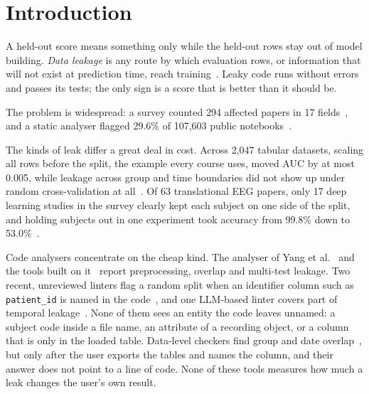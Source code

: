 \documentclass[conference]{IEEEtran}
\newcommand{\code}[1]{\texttt{#1}}
\begin{document}
\section{Introduction}

A held-out score means something only while the held-out rows stay out of model building. \emph{Data
leakage} is any route by which evaluation rows, or information that will not exist at prediction time, reach
training~\cite{kaufman2012}. Leaky code runs without errors and passes its tests; the only sign is a score that
is better than it should be.

The problem is widespread: a survey counted 294 affected papers in 17
fields~\cite{kapoor2023}, and a static analyser flagged 29.6\% of 107,603 public notebooks~\cite{yang2022}.

The kinds of leak differ a great deal in cost. Across 2,047 tabular datasets, scaling all rows before the split,
the example every course uses, moved AUC by at most 0.005, while leakage across group and time boundaries did not
show up under random cross-validation at all~\cite{roth2026}. Of 63 translational EEG papers, only 17
deep learning studies in the survey clearly kept each subject on one side of the split, and holding subjects out
in one experiment took accuracy from 99.8\% down to 53.0\%~\cite{brookshire2024}.

Code analysers concentrate on the cheap kind. The analyser of Yang et al.~\cite{yang2022} and the tools built on
it~\cite{alomar2025,truong2025,draoui2026} report preprocessing, overlap and multi-test leakage. Two recent,
unreviewed linters flag a random split when an identifier column such as \code{patient\_id} is named in the
code~\cite{leakray,unleak}, and one LLM-based linter covers part of temporal leakage~\cite{samsonau2026}. None
of them sees an entity the code leaves unnamed: a subject code inside a file name, an attribute of a recording
object, or a column that is only in the loaded table. Data-level checkers find group and date
overlap~\cite{chorev2022,leakcheckml,leakhound}, but only after the user exports the tables and names the column,
and their answer does not point to a line of code. None of these tools measures how much a leak changes the
user's own result.
\end{document}
